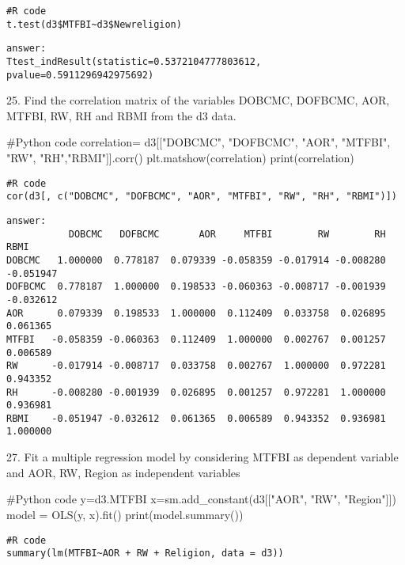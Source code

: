 \documentclass{article}
\begin{document}
\begin{verbatim}
#R code
t.test(d3$MTFBI~d3$Newreligion)

\end{verbatim}

\begin{verbatim}
answer: 
Ttest_indResult(statistic=0.5372104777803612, pvalue=0.5911296942975692)
\end{verbatim}


25.	Find the correlation matrix of the variables DOBCMC, DOFBCMC, AOR, MTFBI, RW, RH and RBMI from the d3 data.
\begin{pythoncode}
#Python code
correlation= d3[["DOBCMC", "DOFBCMC", "AOR", "MTFBI", "RW", "RH","RBMI"]].corr()
plt.matshow(correlation)
print(correlation)
\end{pythoncode}

\begin{verbatim}
#R code
cor(d3[, c("DOBCMC", "DOFBCMC", "AOR", "MTFBI", "RW", "RH", "RBMI")])
\end{verbatim}

\begin{verbatim}
answer: 
           DOBCMC   DOFBCMC       AOR     MTFBI        RW        RH      RBMI
DOBCMC   1.000000  0.778187  0.079339 -0.058359 -0.017914 -0.008280 -0.051947
DOFBCMC  0.778187  1.000000  0.198533 -0.060363 -0.008717 -0.001939 -0.032612
AOR      0.079339  0.198533  1.000000  0.112409  0.033758  0.026895  0.061365
MTFBI   -0.058359 -0.060363  0.112409  1.000000  0.002767  0.001257  0.006589
RW      -0.017914 -0.008717  0.033758  0.002767  1.000000  0.972281  0.943352
RH      -0.008280 -0.001939  0.026895  0.001257  0.972281  1.000000  0.936981
RBMI    -0.051947 -0.032612  0.061365  0.006589  0.943352  0.936981  1.000000
\end{verbatim}


27.	Fit a multiple regression model by considering MTFBI as dependent variable and AOR, RW, Region as independent variables
\begin{pythoncode}
#Python code
y=d3.MTFBI
x=sm.add_constant(d3[["AOR", "RW", "Region"]])
model = OLS(y, x).fit()
print(model.summary())
\end{pythoncode}

\begin{verbatim}
#R code
summary(lm(MTFBI~AOR + RW + Religion, data = d3))
\end{verbatim}
\end{document}
